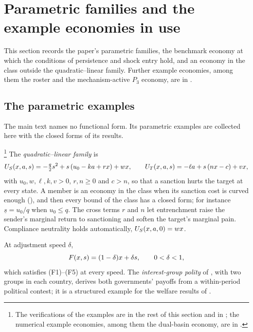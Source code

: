 \section{Parametric families and the example economies in use}
\label{app:witness}

This section records the paper's parametric families, the benchmark economy at which the
conditions of persistence and shock entry hold, and an economy in the class outside the
quadratic--linear family. Further example economies, among them the roster and the
mechanism-active $P_3$ economy, are in .

\subsection{The parametric examples}
\label{sec:model:family}
\label{sec:model:examples}

The main text names no functional form. Its parametric examples are collected here with the closed forms of its results.

\footnote{The verifications
of the examples are in the rest of this section and in ;
the numerical example economies, among them the dual-basin economy, are in
.} The
\emph{quadratic--linear family} is
\begin{equation}
U_S(x,a,s)=-\tfrac{q}{2}s^2+s\,(u_0-ka+rx)+wx,
\qquad
U_T(x,a,s)=-\ell a+s\,(nx-c)+vx,
\label{eq:ql-family}
\end{equation}
with $u_0,w,\ell,k,v>0$, $r,n\ge0$ and $c>n$, so that a sanction hurts the
target at every state. A member is an economy in the class when its sanction
cost is curved enough (), and then every bound of the
class has a closed form; for instance $\underline s=u_0/q$ when $u_0\le q$. The
cross terms $r$ and $n$ let entrenchment raise the sender's marginal return to
sanctioning and soften the target's marginal pain. Compliance neutrality holds
automatically, $U_S(x,a,0)=wx$.

 At adjustment speed $\delta$,
\begin{equation}
F(x,s)=(1-\delta)x+\delta s,\qquad 0<\delta<1,
\label{eq:affine}
\end{equation}
which satisfies \textup{(F1)--(F5)} at every speed. The \emph{interest-group
polity} of , with two groups in each country, derives both
governments' payoffs from a within-period political contest; it is a
structured example for the welfare results of .


